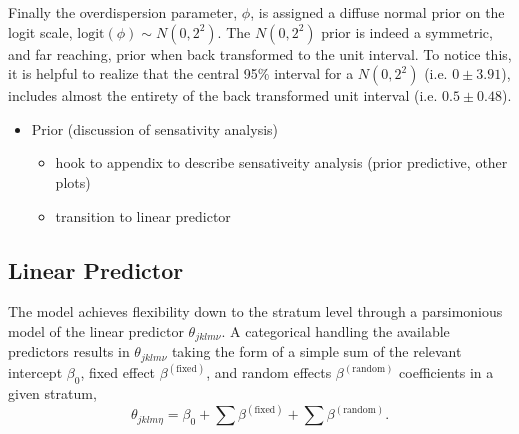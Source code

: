 \documentclass[12pt]{article}
\begin{document}
%
Finally the overdispersion parameter, \(\phi\), is assigned a diffuse
normal prior on the logit scale, \(\text{logit}(\phi) \sim N(0, 2^2)\).
The \(N(0, 2^2)\) prior is indeed a symmetric, and far reaching, prior
when back transformed to the unit interval. To notice this, it is
helpful to realize that the central 95\% interval for a \(N(0, 2^2)\)
(i.e. \(0\pm3.91\)), includes almost the entirety of the back
transformed unit interval (i.e. \(0.5\pm0.48\)).


%

\begin{itemize}
\item Prior (discussion of sensativity analysis)
	\begin{itemize}
	\item hook to appendix to describe sensativeity analysis (prior predictive, other plots)
	\item transition to linear predictor
	\end{itemize}
\end{itemize}

%
%
\subsection{Linear Predictor}\label{lp}
%
%

%
The model achieves flexibility down to the stratum level through a 
parsimonious model of the linear predictor $\theta_{jklm\nu}$. A categorical 
handling the available predictors results in $\theta_{jklm\nu}$ taking the 
form of a simple sum of the relevant intercept $\beta_0$, fixed effect 
$\beta^{(\text{fixed})}$, and random effects $\beta^{(\text{random})}$ 
coefficients in a given stratum, 
%
\begin{equation}
\theta_{jklm\eta} = \beta_0 + \sum\beta^{(\text{fixed})} + \sum\beta^{(\text{random})}.
\end{equation}
\end{document}
